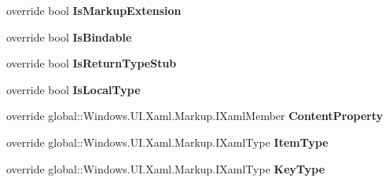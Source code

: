 \begin{DoxyCompactItemize}
override bool {\bfseries Is\+Markup\+Extension}
\item 
\mbox{\label{class_r_f_storage_1_1_r_f_storage___xaml_type_info_1_1_xaml_user_type_a7110f9c4d25325b4d5fa610c8f46d359}} 
override bool {\bfseries Is\+Bindable}
\item 
\mbox{\label{class_r_f_storage_1_1_r_f_storage___xaml_type_info_1_1_xaml_user_type_ab2bc6ffe93082b4d1f149263e6ecc421}} 
override bool {\bfseries Is\+Return\+Type\+Stub}
\item 
\mbox{\label{class_r_f_storage_1_1_r_f_storage___xaml_type_info_1_1_xaml_user_type_a6a708559a2e12ced78415cfbedca015c}} 
override bool {\bfseries Is\+Local\+Type}
\item 
\mbox{\label{class_r_f_storage_1_1_r_f_storage___xaml_type_info_1_1_xaml_user_type_a1c66f797db2210479d072c7b83a60b08}} 
override global\+::\+Windows.\+U\+I.\+Xaml.\+Markup.\+I\+Xaml\+Member {\bfseries Content\+Property}
\item 
\mbox{\label{class_r_f_storage_1_1_r_f_storage___xaml_type_info_1_1_xaml_user_type_a2e20cbd1b20b53293de887020d49394a}} 
override global\+::\+Windows.\+U\+I.\+Xaml.\+Markup.\+I\+Xaml\+Type {\bfseries Item\+Type}
\item 
\mbox{\label{class_r_f_storage_1_1_r_f_storage___xaml_type_info_1_1_xaml_user_type_ae8cf8964a923e76d6d77ffd1386192d8}} 
override global\+::\+Windows.\+U\+I.\+Xaml.\+Markup.\+I\+Xaml\+Type {\bfseries Key\+Type}

\end{DoxyCompactItemize}
